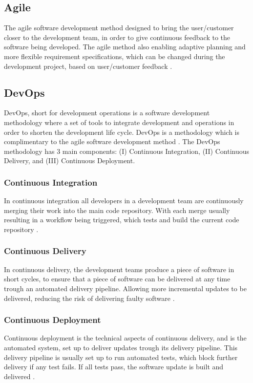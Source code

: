 \subsection{Agile}
The agile software development method designed to bring the user/customer closer to the development team, in order to give continuous feedback to the software being developed. The agile method also enabling adaptive planning and more flexible requirement specifications, which can be changed during the development project, based on user/customer feedback \cite{agile_software_development_wiki_2023}.

\subsection{DevOps}
DevOps, short for development operations is a software development methodology where a set of tools to integrate development and operations in order to shorten the development life cycle. DevOps is a methodology which is complimentary to the agile software development method \cite{devops_wiki_2023}. The DevOps methodology has 3 main components: (I) Continuous Integration, (II) Continuous Delivery, and (III) Continuous Deployment.

\subsubsection{Continuous Integration}
In continuous integration all developers in a development team are continuously merging their work into the main code repository. With each merge usually resulting in a workflow being triggered, which tests and build the current code repository \cite{continuous_integration_wiki_2023}.

\subsubsection{Continuous Delivery}
In continuous delivery, the development teams produce a piece of software in short cycles, to ensure that a piece of software can be delivered at any time trough an automated delivery pipeline. Allowing more incremental updates to be delivered, reducing the risk of delivering faulty software \cite{continuous_delivery_wiki_2023}.

\subsubsection{Continuous Deployment}
Continuous deployment is the technical aspects of continuous delivery, and is the automated system, set up to deliver updates trough its delivery pipeline. This delivery pipeline is usually set up to run automated tests, which block further delivery if any test fails. If all tests pass, the software update is built and delivered \cite{continuous_deployment_wiki_2023}.

